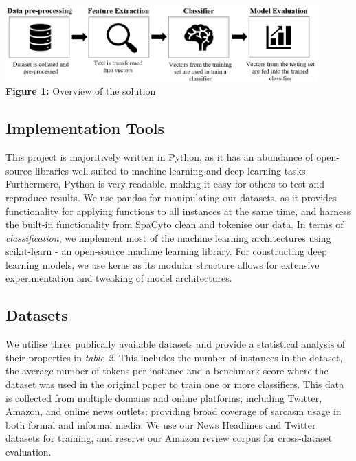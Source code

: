 \documentclass[12pt,a4paper]{article}
\begin{document}
\begin{center}
	\includegraphics[width=0.9\textwidth]{Images/modelpipeline2.png}
	\label{Model Pipeline}\\
	\textbf{Figure 1:} Overview of the solution
\end{center}

\subsection{Implementation Tools}\vspace{-4.2pt}
\noindent This project is majoritively written in Python, as it has an abundance of open-source libraries well-suited to machine learning and deep learning tasks. Furthermore, Python is very readable, making it easy for others to test and reproduce results. We use pandas for manipulating our datasets, as it provides functionality for applying functions to all instances at the same time, and harness the built-in functionality from SpaCy\footnotemark[3] to clean and tokenise our data. In terms of \textit{classification}, we implement most of the machine learning architectures using scikit-learn \cite{mckinney-proc-scipy-2010} - an open-source machine learning library. For constructing deep learning models, we use keras as its modular structure allows for extensive experimentation and tweaking of model architectures.

\subsection{Datasets}
\vspace{-4.2pt}\noindent We utilise three publically available datasets and provide a statistical analysis of their properties in \textit{table 2}. This includes the number of instances in the dataset, the average number of tokens per instance and a benchmark score where the dataset was used in the original paper to train one or more classifiers. This data is collected from multiple domains and online platforms, including Twitter, Amazon, and online news outlets; providing broad coverage of sarcasm usage in both formal and informal media. We use our News Headlines and Twitter datasets for training, and reserve our Amazon review corpus for cross-dataset evaluation.\vspace{-5pt}
\end{document}
